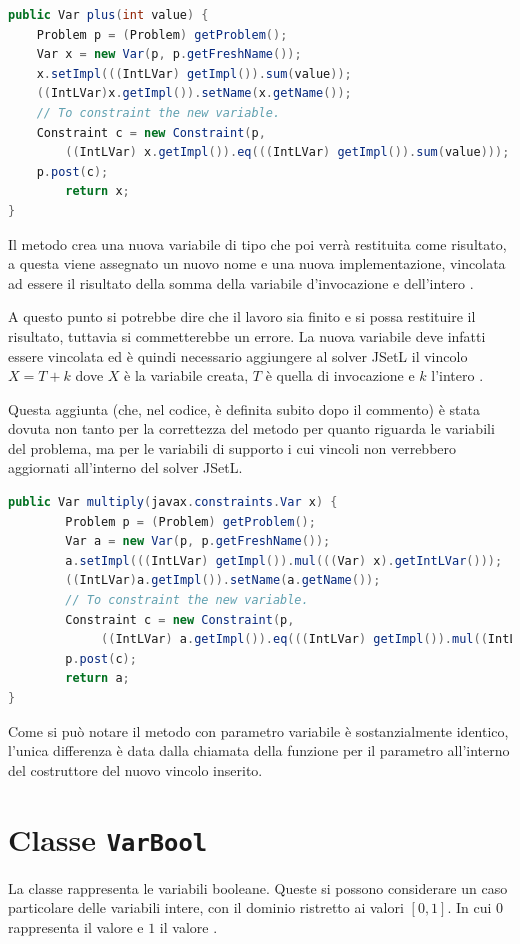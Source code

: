 \begin{lstlisting}[language = Java,
                   caption = {\files{plus}, con parametro intero.}]
public Var plus(int value) {
	Problem p = (Problem) getProblem();
	Var x = new Var(p, p.getFreshName());
	x.setImpl(((IntLVar) getImpl()).sum(value));
	((IntLVar)x.getImpl()).setName(x.getName());
	// To constraint the new variable.
	Constraint c = new Constraint(p,
		((IntLVar) x.getImpl()).eq(((IntLVar) getImpl()).sum(value)));
	p.post(c);
        return x;
}
\end{lstlisting}
Il metodo crea una nuova variabile  di tipo  che
poi verrà restituita come risultato, a questa viene assegnato un nuovo nome
e una nuova implementazione, vincolata ad essere il risultato della somma
della variabile d'invocazione e dell'intero .

A questo punto si potrebbe dire che il lavoro sia finito e si possa
restituire il 
risultato, tuttavia si commetterebbe un errore. La nuova variabile deve infatti
essere vincolata ed è quindi necessario aggiungere al
solver JSetL il vincolo $X = T+k$ dove $X$ è la variabile creata, $T$ è
quella di invocazione e $k$ l'intero .

Questa aggiunta (che, nel codice, è definita subito dopo il commento) è stata
dovuta non tanto per la correttezza del metodo per quanto riguarda le variabili
del problema, ma per le variabili di supporto i cui vincoli non verrebbero 
aggiornati all'interno del solver JSetL.

\begin{lstlisting}[language = Java,
                   caption = {\files{multiply}, con parametro variabile.}]
public Var multiply(javax.constraints.Var x) {
        Problem p = (Problem) getProblem();
        Var a = new Var(p, p.getFreshName());
        a.setImpl(((IntLVar) getImpl()).mul(((Var) x).getIntLVar()));
        ((IntLVar)a.getImpl()).setName(a.getName());
        // To constraint the new variable.
        Constraint c = new Constraint(p,
             ((IntLVar) a.getImpl()).eq(((IntLVar) getImpl()).mul((IntLVar) x.getImpl())));
        p.post(c);
        return a;
}
\end{lstlisting}
Come si può notare il metodo con parametro variabile è sostanzialmente identico,
l'unica differenza è data dalla chiamata della funzione 
per il parametro  all'interno del costruttore del nuovo vincolo
inserito.

\section{Classe \texttt{VarBool}}
La classe  rappresenta le variabili booleane. Queste si 
possono considerare un caso particolare 
delle variabili intere, con il dominio ristretto ai valori $[0,1]$. In cui
$0$ rappresenta il valore  e $1$ il valore .

